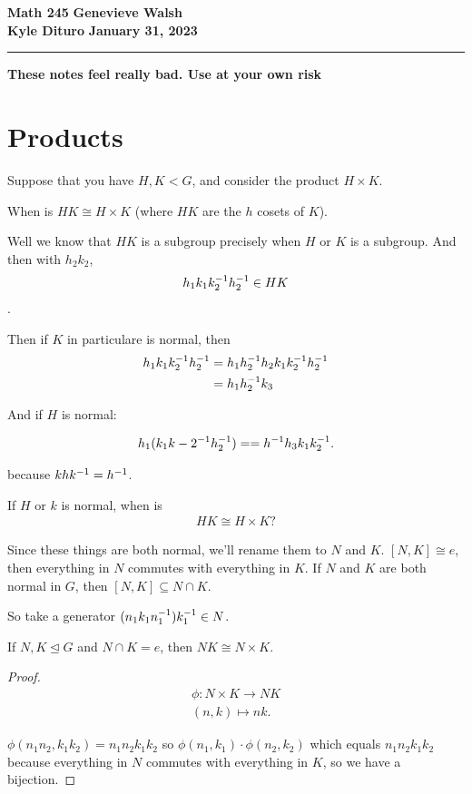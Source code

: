 \documentclass[12pt, twosided]{article}
\begin{document}
\noindent \textbf{Math 245} \hfill \textbf{Genevieve Walsh} \\
\textbf{Kyle Dituro} \hfill \textbf{January 31\stt, 2023}\hrule
\vspace{.2in}

\begin{center}
  {\huge \textbf{These notes feel really bad. Use at your own risk}}
\end{center}
\vspace{.2in}
\section{Products}


Suppose that you have \(H, K < G\), and consider the product \(H \times K\).

\begin{ques}
  When is \(HK \cong H \times K\) (where \(HK\) are the \(h\) cosets of \(K\)).
\end{ques}

Well we know that \(HK\) is a subgroup precisely when \(H\) or \(K\) is a subgroup. And then with \(h_2k_2\),
\begin{align*}
  h_1k_1k_2^{-1}h_2^{-1} \in HK
\end{align*}.

Then if \(K\) in particulare is normal, then
\begin{align*}
  h_1k_1k_2^{-1} h_2^{-1} &= h_1h_2^{-1} h_2k_1k_2^{-1} h_2 ^{-1} \\
                   &=h_1h_2^{-1} k_3
\end{align*}

And if \(H\) is normal:

\begin{align*}
  h_1(k_1k-2^{-1}h_2^{-1}) = = h^{-1}h_3k_1k_2^{-1}.
\end{align*}

because \(khk^{-1} = h^{-1}\).

If \(H\) or \(k\) is normal, when is
\begin{align*}
  HK \cong H \times K?
\end{align*}

Since these things are both normal, we'll rename them to \(N\) and \(K\). \([N, K] \cong e\), then everything in \(N\) commutes with everything in \(K\). If \(N\) and \(K\) are both normal in \(G\), then \([N, K] \subseteq N \cap K\).

So take a generator \((n_1k_1n_1^{-1})k_1^{-1} \in N\).

\begin{thm}
  If \(N, K \trianglelefteq G\)  and \(N \cap K = e\), then \(NK \cong N \times K\).
\end{thm}
\begin{proof}
  \begin{align*}
    \phi: N \times K \to NK \\
    (n,k) \mapsto nk.
  \end{align*}

  \(\phi(n_1n_2, k_1k_2) = n_1n_2k_1k_2\) so \(\phi(n_1, k_1) \cdot \phi(n_2, k_2)\) which equals \(n_1n_2k_1k_2\) because everything in \(N\) commutes with everything in \(K\), so we have a bijection.
\end{proof}
\end{document}
